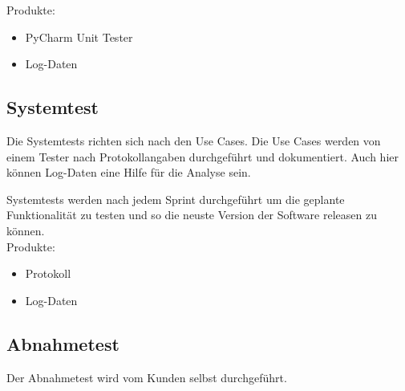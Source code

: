 \documentclass[11pt]{scrartcl}
\begin{document}
Produkte:
\begin{itemize}
\item PyCharm Unit Tester
\item Log-Daten
\end{itemize}

\subsection{Systemtest}
Die Systemtests richten sich nach den Use Cases. Die Use Cases werden von einem Tester nach Protokollangaben durchgeführt und dokumentiert. Auch hier können Log-Daten eine Hilfe für die Analyse sein.

Systemtests werden nach jedem Sprint durchgeführt um die geplante Funktionalität 
zu testen und so die neuste Version der Software releasen zu können.\\

Produkte:
\begin{itemize}
\item Protokoll
\item Log-Daten
\end{itemize}

\subsection{Abnahmetest}
Der Abnahmetest wird vom Kunden selbst durchgeführt.
\end{document}
